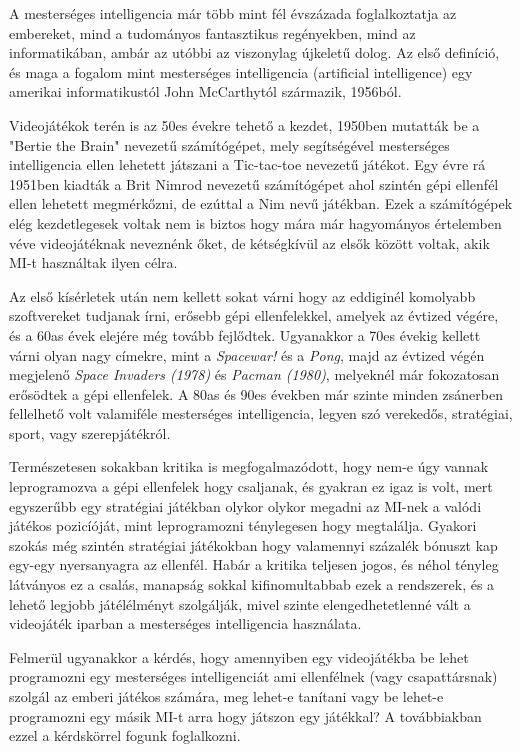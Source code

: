 
A mesterséges intelligencia már több mint fél évszázada foglalkoztatja az embereket, mind a tudományos fantasztikus regényekben, mind az informatikában, ambár az utóbbi az viszonylag újkeletű dolog. Az első definíció, és maga a fogalom mint mesterséges intelligencia (artificial intelligence) egy amerikai informatikustól John McCarthytól származik, 1956ból.

Videojátékok terén is az 50es évekre tehető a kezdet, 1950ben mutatták be a "Bertie the Brain" nevezetű számítógépet, mely segítségével mesterséges intelligencia ellen lehetett játszani a Tic-tac-toe nevezetű játékot. Egy évre rá 1951ben kiadták a Brit Nimrod nevezetű számítógépet ahol szintén gépi ellenfél ellen lehetett megmérkőzni, de ezúttal a Nim nevű játékban.
Ezek a számítógépek elég kezdetlegesek voltak nem is biztos hogy mára már hagyományos értelemben véve videojátéknak neveznénk őket, de kétségkívül az elsők között voltak, akik MI-t használtak ilyen célra.

Az első kísérletek után nem kellett sokat várni hogy az eddiginél komolyabb szoftvereket tudjanak írni, erősebb gépi ellenfelekkel, amelyek az évtized végére, és a 60as évek elejére még tovább fejlődtek. Ugyanakkor a 70es évekig kellett várni olyan nagy címekre, mint a \textit{Spacewar!} és a \textit{Pong}, majd az évtized végén megjelenő \textit{ Space Invaders (1978)} és \textit{Pacman (1980)}, melyeknél már fokozatosan erősödtek a gépi ellenfelek.
A 80as és 90es években már szinte minden zsánerben fellelhető volt valamiféle mesterséges intelligencia, legyen szó verekedős, stratégiai, sport, vagy szerepjátékról.

Természetesen sokakban kritika is megfogalmazódott, hogy nem-e úgy vannak leprogramozva a gépi ellenfelek hogy csaljanak, és gyakran ez igaz is volt, mert egyszerűbb egy stratégiai játékban olykor olykor megadni az MI-nek a valódi játékos pozicíóját, mint leprogramozni ténylegesen hogy megtalálja. Gyakori szokás még szintén stratégiai játékokban hogy valamennyi százalék bónuszt kap egy-egy nyersanyagra az ellenfél. Habár a kritika teljesen jogos, és néhol tényleg látványos ez a csalás, manapság sokkal kifinomultabbab ezek a rendszerek, és a lehető legjobb játélélményt szolgálják, mivel szinte elengedhetetlenné vált a videojáték iparban a mesterséges intelligencia használata.

Felmerül ugyanakkor a kérdés, hogy amennyiben egy videojátékba be lehet programozni egy mesterséges intelligenciát ami ellenfélnek (vagy csapattársnak) szolgál az emberi játékos számára, meg lehet-e tanítani vagy be lehet-e programozni egy másik MI-t arra hogy játszon egy játékkal? A továbbiakban ezzel a kérdskörrel fogunk foglalkozni.
\iffalse
\Section{Ember a gép ellen}
aaaaa

\Section{AlphaStar}
Talán a 
\fi